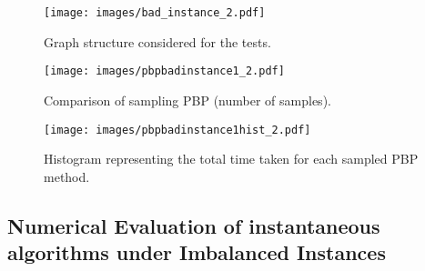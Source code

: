 {%
\begin{figure}[h]
    \centering
        \begin{minipage}{0.29
        \textwidth}
        \centering
        \texttt{[image: images/bad\_instance\_2.pdf]}
        \caption{\small{Graph structure considered for the tests.}}
        \label{fig:instance_pbp}
    \end{minipage}\hfill
    \begin{minipage}{0.33\textwidth}
        \centering
        \texttt{[image: images/pbpbadinstance1\_2.pdf]}
        \caption{\small{Comparison of sampling PBP (number of samples).}}
        \label{fig: pbpbad1}
    \end{minipage}\hfill
    \begin{minipage}{0.33\textwidth}
        \centering
        \texttt{[image: images/pbpbadinstance1hist\_2.pdf]}
        \caption{\small{Histogram representing the total time taken for each sampled PBP method.}}
        \label{fig: pbpbad1hist}
        \vfill \hfill
    \end{minipage}
\end{figure}









\subsection{Numerical Evaluation of instantaneous algorithms under Imbalanced Instances}

}
